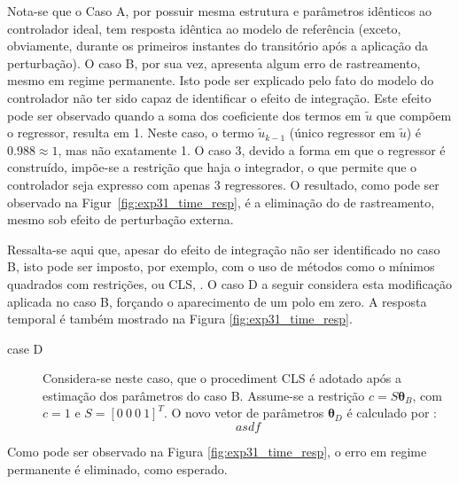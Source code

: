 \begin{exmp}
   Nota-se que o Caso A, por possuir mesma estrutura e parâmetros idênticos ao controlador ideal, tem resposta idêntica ao modelo de referência (exceto, obviamente, durante os primeiros instantes do transitório após a aplicação da perturbação).
   O caso B, por sua vez, apresenta algum erro de rastreamento, mesmo em regime permanente. Isto pode ser explicado pelo fato do modelo do controlador não ter sido capaz de identificar o efeito de integração. Este efeito pode ser observado quando a soma dos coeficiente dos termos em $\tilde{u}$ que compõem o regressor, resulta em 1. Neste caso, o termo $\tilde{u}_{k-1}$ (único regressor em $\tilde{u}$) é $0.988 \approx 1$, mas não exatamente 1.
   O caso 3, devido a forma em que o regressor é construído, impõe-se a restrição que haja o integrador, o que permite que o controlador seja expresso com apenas 3 regressores. O resultado, como pode ser observado na Figur~\ref{fig:exp31_time_resp}, é a eliminação do de rastreamento, mesmo sob efeito de perturbação externa.

   Ressalta-se aqui que, apesar do efeito de integração não ser identificado no caso B, isto pode ser imposto, por exemplo, com o uso de métodos como o mínimos quadrados com restrições, ou CLS, \cite{draper1998}. O caso D a seguir considera esta modificação aplicada no caso B, forçando o aparecimento de um polo em zero. A resposta temporal é também mostrado na Figura \ref{fig:exp31_time_resp}.

   \begin{description}
      \item[case D] Considera-se neste caso, que o procediment CLS é adotado após a estimação dos parâmetros do caso B. Assume-se a restrição $c=S \bm{\theta}_B$, com $c=1$ e $S = [0\ 0\ 0 \ 1]^T$. O novo vetor de parâmetros $\bm{\theta}_D$ é calculado por \cite{draper1998}:
         \begin{equation}
            asdf
         \end{equation}
   \end{description}

   Como pode ser observado na Figura \ref{fig:exp31_time_resp}, o erro em regime permanente é eliminado, como esperado.

\end{exmp}


